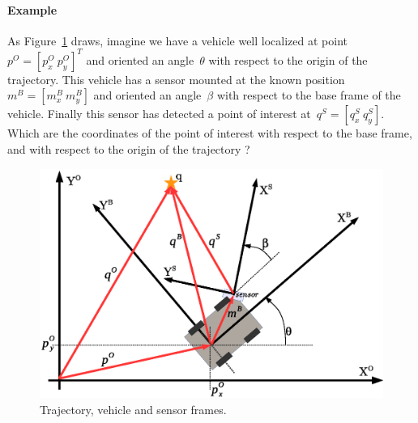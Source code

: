 \paragraph{Example}
As Figure~\ref{fig:world_vehicle_sensor_frames} draws, imagine we have a vehicle well localized at point $p^O=\left[p^O_x\ p^O_y\right]^T$ and oriented an angle~$\theta$ with respect to the origin of the trajectory. This vehicle has a sensor mounted at the known position~$m^B=[m^B_x\ m^B_y]$ and oriented an angle~$\beta$ with respect to the base frame of the vehicle. Finally this sensor has detected a point of interest at~$q^S=[q^S_x\ q^S_y]$. Which are the coordinates of the point of interest with respect to the base frame, and with respect to the origin of the trajectory ?
\begin{figure}[bth!]
  \begin{center}
    \includegraphics[width=1.0\columnwidth]{figures/world_vehicle_sensor_frames.eps}
    \caption{Trajectory, vehicle and sensor frames.}
    \label{fig:world_vehicle_sensor_frames}
  \end{center}
\end{figure}

